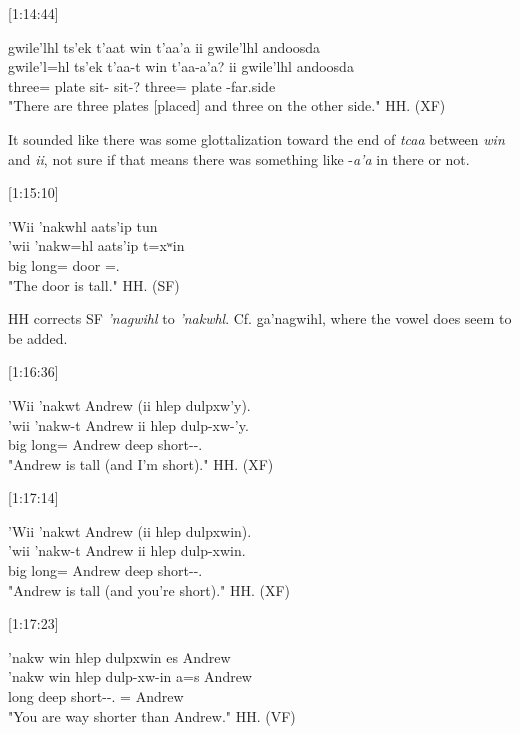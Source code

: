 [1:14:44]
\begin{exe}
    \ex \glll
    gwile'lhl ts’ek t’aat win t’aa’a ii gwile’lhl andoosda \\
    gwile'l=hl ts’ek t’aa-t win t’aa-a'a? ii gwile’lhl andoosda \\
    three=\Cn{} plate sit-\Sx{} \Comp{} sit-\Detr? \Ccnj{} three=\Cn{} plate \Nmlz-far.side \\
    \glt "There are three plates [placed] and three on the other side." \hfill HH.\ElicitationDate{} (XF)
\end{exe}

It sounded like there was some glottalization toward the end of \textit{tcaa} between \textit{win} and \textit{ii}, not sure if that means there was something like -\textit{a’a} in there or not. 

[1:15:10]
\begin{exe}
    \ex \glll
    ’Wii ’nakwhl aats’ip tun \\
    ’wii ’nakw=hl aats’ip t=xʷin \\
    big long=\Cn{} door \Pn=\Dem.\Prox \\
    \glt "The door is tall." \hfill HH.\ElicitationDate{} (SF)
\end{exe}

HH corrects SF \textit{’nagwihl} to \textit{’nakwhl}. Cf. {g̱a’nagwihl}, where the vowel does seem to be added. 

[1:16:36]
\begin{exe}
    \ex \glll
    ’Wii ’nakwt Andrew (ii hlep dulpxw'y). \\
    ’wii ’nakw-t Andrew ii hlep dulp-xw-'y. \\
    big long=\Pn{} Andrew \Ccnj{} deep short-\Val-\Fsg.\Ii{} \\
    \glt "Andrew is tall (and I'm short)." \hfill HH.\ElicitationDate{} (XF)
\end{exe}

[1:17:14]
\begin{exe}
    \ex \glll
    ’Wii ’nakwt Andrew (ii hlep dulpxwin). \\
    ’wii ’nakw-t Andrew ii hlep dulp-xwin. \\
    big long=\Pn{} Andrew \Ccnj{} deep short-\Val-\Ssg.\Ii{} \\
    \glt "Andrew is tall (and you're short)." \hfill HH.\ElicitationDate{} (XF)
\end{exe}

[1:17:23]
\begin{exe}
    \ex \glll
    ’nakw win hlep dulpxwin es Andrew \\
    ’nakw win hlep dulp-xw-in a=s Andrew \\
    long \Comp{} deep short-\Val-\Ssg.\Ii{} \Prep=\Pn{} Andrew \\
    \glt "You are way shorter than Andrew." \hfill HH.\ElicitationDate{} (VF)
\end{exe}

